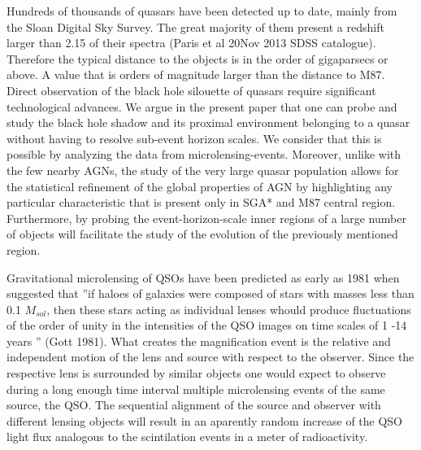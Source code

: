 Hundreds of thousands of quasars have been detected up to date, mainly from the Sloan Digital Sky Survey. The great majority of them present a redshift larger than 2.15 of their spectra (Paris et al 20Nov 2013 SDSS catalogue). Therefore the typical distance to the objects is in the order of gigaparsecs  or above. A value that is orders of magnitude larger than the distance to M87. Direct observation of the black hole silouette of quasars require significant technological advances. We argue in the present paper
 that one can probe and study the black hole shadow and its proximal environment belonging to a quasar without having to resolve sub-event horizon scales. We consider that this is possible by analyzing the data from microlensing-events.  Moreover, unlike with the few nearby AGNs, the study of the very large quasar population allows for the statistical refinement of the global properties of AGN by highlighting any particular
characteristic that is present only in SGA* and M87 central region. Furthermore, by probing the event-horizon-scale inner regions of a large number of objects will facilitate the study of the evolution of the previously mentioned region.     
     
Gravitational microlensing of QSOs have been predicted as early as 1981 when \cite{1981ApJ...243..140G} suggested that ''if haloes of galaxies were composed of stars with masses less than  0.1 $M_{sol}$, then these stars acting as individual lenses whould produce fluctuations of the order of 
unity in the intensities of the QSO images on time scales of 1 -14 years '' (Gott 1981). What creates the magnification event is the relative and independent motion of the lens and source with respect to the observer. Since the respective lens is surrounded by similar objects one would expect to observe during a long enough time interval
multiple microlensing events of the same source, the QSO. The sequential alignment of the source and observer with different lensing objects will result in an aparently random increase of the QSO light flux analogous to the scintilation events in a meter of radioactivity.


